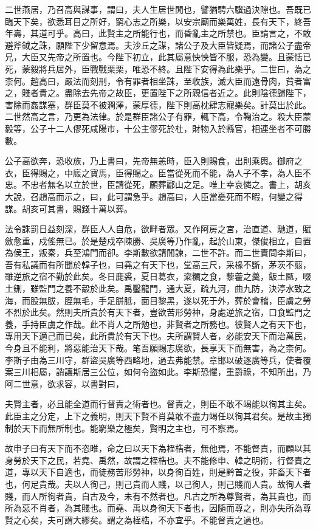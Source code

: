 二世燕居，乃召高與謀事，謂曰，夫人生居世閒也，譬猶騁六驥過決隙也。吾既已臨天下矣，欲悉耳目之所好，窮心志之所樂，以安宗廟而樂萬姓，長有天下，終吾年壽，其道可乎。高曰，此賢主之所能行也，而昏亂主之所禁也。臣請言之，不敢避斧鉞之誅，願陛下少留意焉。夫沙丘之謀，諸公子及大臣皆疑焉，而諸公子盡帝兄，大臣又先帝之所置也。今陛下初立，此其屬意怏怏皆不服，恐為變。且蒙恬已死，蒙毅將兵居外，臣戰戰栗栗，唯恐不終。且陛下安得為此樂乎。二世曰，為之柰何。趙高曰，嚴法而刻刑，令有罪者相坐誅，至收族，滅大臣而遠骨肉，貧者富之，賤者貴之。盡除去先帝之故臣，更置陛下之所親信者近之。此則陰德歸陛下，害除而姦謀塞，群臣莫不被潤澤，蒙厚德，陛下則高枕肆志寵樂矣。計莫出於此。二世然高之言，乃更為法律。於是群臣諸公子有罪，輒下高，令鞠治之。殺大臣蒙毅等，公子十二人僇死咸陽市，十公主僇死於杜，財物入於縣官，相連坐者不可勝數。

公子高欲奔，恐收族，乃上書曰，先帝無恙時，臣入則賜食，出則乘輿。御府之衣，臣得賜之，中廄之寶馬，臣得賜之。臣當從死而不能，為人子不孝，為人臣不忠。不忠者無名以立於世，臣請從死，願葬酈山之足。唯上幸哀憐之。書上，胡亥大說，召趙高而示之，曰，此可謂急乎。趙高曰，人臣當憂死而不暇，何變之得謀。胡亥可其書，賜錢十萬以葬。

法令誅罰日益刻深，群臣人人自危，欲畔者眾。又作阿房之宮，治直道、馳道，賦斂愈重，戍傜無已。於是楚戍卒陳勝、吳廣等乃作亂，起於山東，傑俊相立，自置為侯王，叛秦，兵至鴻門而卻。李斯數欲請閒諫，二世不許。而二世責問李斯曰，吾有私議而有所聞於韓子也，曰堯之有天下也，堂高三尺，采椽不斲，茅茨不翦，雖逆旅之宿不勤於此矣。冬日鹿裘，夏日葛衣，粢糲之食，藜藿之羹，飯土匭，啜土鉶，雖監門之養不觳於此矣。禹鑿龍門，通大夏，疏九河，曲九防，決渟水致之海，而股無胈，脛無毛，手足胼胝，面目黎黑，遂以死于外，葬於會稽，臣虜之勞不烈於此矣。然則夫所貴於有天下者，豈欲苦形勞神，身處逆旅之宿，口食監門之養，手持臣虜之作哉。此不肖人之所勉也，非賢者之所務也。彼賢人之有天下也，專用天下適己而已矣，此所貴於有天下也。夫所謂賢人者，必能安天下而治萬民，今身且不能利，將惡能治天下哉。笔吾願賜志廣欲，長享天下而無害，為之柰何。李斯子由為三川守，群盜吳廣等西略地，過去弗能禁。章邯以破逐廣等兵，使者覆案三川相屬，誚讓斯居三公位，如何令盜如此。李斯恐懼，重爵祿，不知所出，乃阿二世意，欲求容，以書對曰，

夫賢主者，必且能全道而行督責之術者也。督責之，則臣不敢不竭能以徇其主矣。此臣主之分定，上下之義明，則天下賢不肖莫敢不盡力竭任以徇其君矣。是故主獨制於天下而無所制也。能窮樂之極矣，賢明之主也，可不察焉。

故申子曰有天下而不恣睢，命之曰以天下為桎梏者，無他焉，不能督責，而顧以其身勞於天下之民，若堯、禹然，故謂之桎梏也。夫不能修申、韓之明術，行督責之道，專以天下自適也，而徒務苦形勞神，以身徇百姓，則是黔首之役，非畜天下者也，何足貴哉。夫以人徇己，則己貴而人賤，以己徇人，則己賤而人貴。故徇人者賤，而人所徇者貴，自古及今，未有不然者也。凡古之所為尊賢者，為其貴也，而所為惡不肖者，為其賤也。而堯、禹以身徇天下者也，因隨而尊之，則亦失所為尊賢之心矣，夫可謂大繆矣。謂之為桎梏，不亦宜乎。不能督責之過也。

